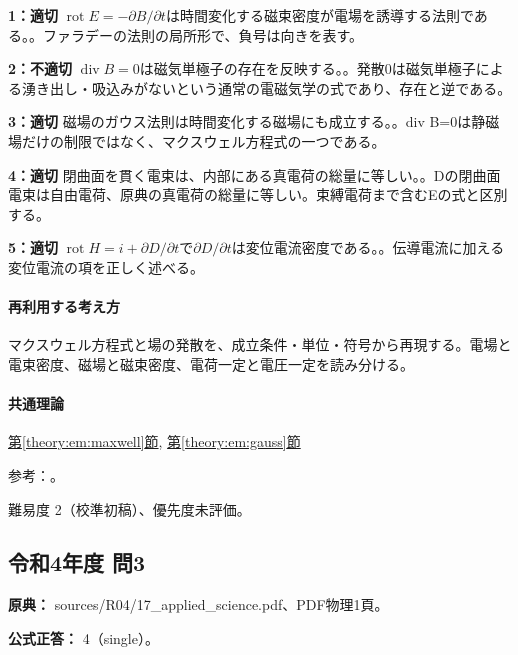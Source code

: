 \noindent\textbf{1：適切} \(\operatorname{rot}E=-\partial B/\partial t\)は時間変化する磁束密度が電場を誘導する法則である。。ファラデーの法則の局所形で、負号は向きを表す。\par

\noindent\textbf{2：不適切} \(\operatorname{div}B=0\)は磁気単極子の存在を反映する。。発散0は磁気単極子による湧き出し・吸込みがないという通常の電磁気学の式であり、存在と逆である。\par

\noindent\textbf{3：適切} 磁場のガウス法則は時間変化する磁場にも成立する。。div B=\allowbreak{}0は静磁場だけの制限ではなく、マクスウェル方程式の一つである。\par

\noindent\textbf{4：適切} 閉曲面を貫く電束は、内部にある真電荷の総量に等しい。。Dの閉曲面電束は自由電荷、原典の真電荷の総量に等しい。束縛電荷まで含むEの式と区別する。\par

\noindent\textbf{5：適切} \(\operatorname{rot}H=i+\partial D/\partial t\)で\(\partial D/\partial t\)は変位電流密度である。。伝導電流に加える変位電流の項を正しく述べる。\par

\paragraph{再利用する考え方} マクスウェル方程式と場の発散を、成立条件・単位・符号から再現する。電場と電束密度、磁場と磁束密度、電荷一定と電圧一定を読み分ける。

\paragraph{共通理論} \hyperref[theory:em:maxwell]{第\ref*{theory:em:maxwell}節}, \hyperref[theory:em:gauss]{第\ref*{theory:em:gauss}節}

\par 参考：\cite{mit_em13}。

\par 難易度 2（校準初稿）、優先度未評価。

\subsection{令和4年度 問3}
\label{q:r04-reg-applied-03}

\noindent\textbf{原典：} sources/R04/17\_applied\_science.pdf、PDF物理1頁。

\textbf{公式正答：} 4（single）。

